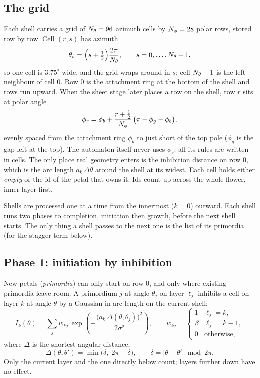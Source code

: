 \subsection{The grid}\label{sec:ca-grid}
Each shell carries a grid of $N_\theta = 96$ azimuth cells by $N_\phi = 28$ polar
rows, stored row by row. Cell $(r,s)$ has azimuth
\[
  \theta_s = \Bigl(s + \tfrac12\Bigr)\frac{2\pi}{N_\theta}, \qquad s = 0,\dots,N_\theta-1,
\]
so one cell is $3.75^\circ$ wide, and the grid wraps around in $s$: cell
$N_\theta-1$ is the left neighbour of cell 0. Row 0 is the attachment ring at the
bottom of the shell and rows run upward. When the sheet stage later places a
row on the shell, row $r$ sits at polar angle
\[
  \phi_r = \phi_b + \frac{r + \frac12}{N_\phi}\,\bigl(\pi - \phi_g - \phi_b\bigr),
\]
evenly spaced from the attachment ring $\phi_b$ to just short of the top pole
($\phi_g$ is the gap left at the top). The automaton itself never uses
$\phi_r$: all its rules are written in cells. The only place real geometry
enters is the inhibition distance on row 0, which is the arc length
$a_k\,\Delta\theta$ around the shell at its widest. Each cell holds either
\emph{empty} or the id of the petal that owns it. Ids count up across the
whole flower, inner layer first.

Shells are processed one at a time from the innermost ($k=0$) outward. Each
shell runs two phases to completion, initiation then growth, before the next
shell starts. The only thing a shell passes to the next one is the list of its
primordia (for the stagger term below).

\subsection{Phase 1: initiation by inhibition}\label{sec:ca-init}
New petals (\emph{primordia}) can only start on row 0, and only where existing
primordia leave room. A primordium $j$ at angle $\theta_j$ on layer $\ell_j$
inhibits a cell on layer $k$ at angle $\theta$ by a Gaussian in arc length on
the current shell:
\[
  I_k(\theta) = \sum_j w_{kj}\, \exp\!\left(-\frac{\bigl(a_k\,\Delta(\theta,\theta_j)\bigr)^2}{2\sigma^2}\right),
  \qquad
  w_{kj} = \begin{cases} 1 & \ell_j = k,\\ \beta & \ell_j = k-1,\\ 0 & \text{otherwise,}\end{cases}
\]
where $\Delta$ is the shortest angular distance,
\[
  \Delta(\theta,\theta') = \min\bigl(\delta,\; 2\pi - \delta\bigr), \qquad \delta = |\theta-\theta'| \bmod 2\pi .
\]
Only the current layer and the one directly below count; layers further down
have no effect.

